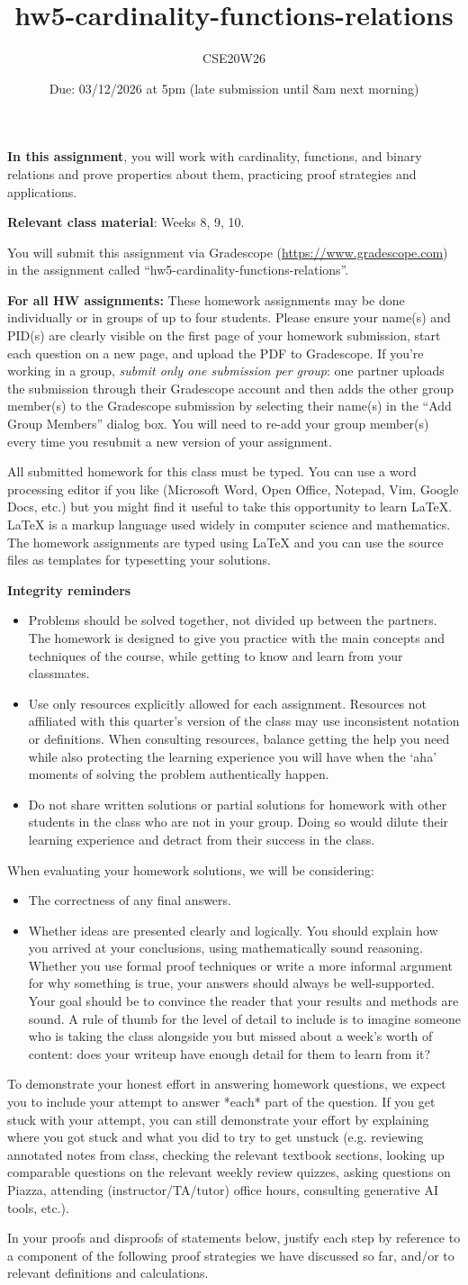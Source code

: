 \documentclass[12pt, oneside]{article}
\author{CSE20W26}
\title{hw5-cardinality-functions-relations}
\date{Due: 03/12/2026 at 5pm (late submission until 8am next morning)}
\newcommand{\instructions}{{\bf For all HW assignments:} 
These homework assignments may be done individually or in groups of up to four students.
Please ensure your name(s) and PID(s)
are clearly visible on the first page of your homework
submission, start each question on a new page, and upload the PDF to Gradescope.
If you're working in a group, {\it submit only one submission per group}: one partner uploads the
submission through their Gradescope account and then adds the other group member(s) to the Gradescope submission
by selecting their name(s) in the ``Add Group Members'' dialog box. You will need to re-add your group member(s)
every time you resubmit a new version of your assignment.

All submitted homework for this class must be typed. 
You can use a word processing editor if you like (Microsoft Word, Open Office, Notepad, Vim, Google Docs, etc.) 
but you might find it useful to take this opportunity to learn LaTeX. 
LaTeX is a markup language used widely in computer science and mathematics. 
The homework assignments are typed using LaTeX and you can use the source files 
as templates for typesetting your solutions.

{\bf Integrity reminders}
\begin{itemize}
\item Problems should be solved together, not divided up between the partners. The homework is
designed to give you practice with the main concepts and techniques of the course, 
while getting to know and learn from your classmates.
\item Use only resources explicitly allowed for each assignment. Resources not affiliated with this quarter's version of the class may use inconsistent notation or definitions. When consulting resources, balance
getting the help you need while also protecting the learning experience you will have when the `aha' moments of solving the problem authentically happen.
\item Do not share written solutions or partial solutions for homework with 
other students in the class who are not in your group. Doing so would dilute their learning 
experience and detract from their success in the class.
\end{itemize}

When evaluating your homework solutions, we will be considering:
\begin{itemize}
\item The correctness of any final answers.
\item Whether ideas are presented clearly and logically. You should explain how you arrived at your conclusions, using
mathematically sound reasoning. Whether you use formal proof techniques or 
write a more informal argument
for why something is true, your answers should always be well-supported. 
Your goal should be to convince the
reader that your results and methods are sound. A rule of thumb for the level of detail to include is to imagine someone who is taking the class alongside you but missed about a week's worth of content: does your writeup have enough detail for them to learn from it?
\end{itemize}
To demonstrate your honest effort in answering homework questions, we 
expect you to include your attempt to answer *each* part of the question. 
If you get stuck with your attempt, you can still demonstrate 
your effort by explaining where you got stuck and what 
you did to try to get unstuck (e.g. reviewing annotated notes from class, checking the relevant textbook sections, looking up comparable questions on the relevant weekly review quizzes, asking questions on Piazza, 
attending (instructor/TA/tutor) office hours, consulting generative AI tools, etc.). 
}
\begin{document}
\maketitle
\thispagestyle{fancy}


{\bf In this assignment},  you will work with cardinality, functions, and binary relations and prove 
properties about them, practicing proof strategies and applications.


{\bf Relevant class material}: Weeks 8, 9, 10.

You will submit this assignment via Gradescope
(\href{https://www.gradescope.com}{https://www.gradescope.com}) 
in the assignment called ``hw5-cardinality-functions-relations''.

\instructions

In your proofs and disproofs of statements below, justify each  step
by reference to  a component of the  following proof  strategies
we  have discussed so far, and/or to relevant definitions and calculations.

\vspace{-10pt}
\end{document}
